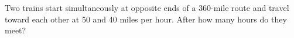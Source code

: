 Two trains start simultaneously at opposite ends of a 360-mile route and travel toward each other at 50 and 40 miles per hour. After how many hours do they meet?
